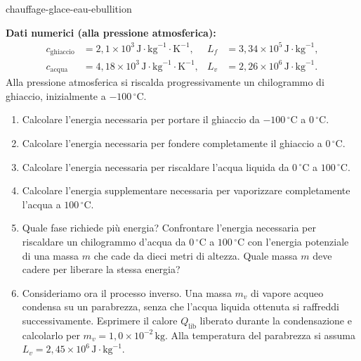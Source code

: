 
\begin{exo}{chauffage-glace-eau-ebullition}

\textbf{Dati numerici (alla pressione atmosferica):}
\[
\begin{aligned}
c_{\text{ghiaccio}} &= 2{,}1\times10^3\,\text{J}\!\cdot\!\text{kg}^{-1}\!\cdot\!\text{K}^{-1},
& L_f &= 3{,}34\times10^5\,\text{J}\!\cdot\!\text{kg}^{-1},\\
c_{\text{acqua}} &= 4{,}18\times10^3\,\text{J}\!\cdot\!\text{kg}^{-1}\!\cdot\!\text{K}^{-1},
& L_v &= 2{,}26\times10^6\,\text{J}\!\cdot\!\text{kg}^{-1}.
\end{aligned}
\]
Alla pressione atmosferica si riscalda progressivamente un chilogrammo di ghiaccio, inizialmente a $-100\,{}^\circ\text{C}$.

\begin{enumerate}
  \item Calcolare l'energia necessaria per portare il ghiaccio da $-100\,{}^\circ\text{C}$ a $0\,{}^\circ\text{C}$.
  \item Calcolare l'energia necessaria per fondere completamente il ghiaccio a $0\,{}^\circ\text{C}$.
  \item Calcolare l'energia necessaria per riscaldare l'acqua liquida da $0\,{}^\circ\text{C}$ a $100\,{}^\circ\text{C}$.
  \item Calcolare l'energia supplementare necessaria per vaporizzare completamente l'acqua a $100\,{}^\circ\text{C}$.
  \item Quale fase richiede più energia? Confrontare l'energia necessaria per riscaldare un chilogrammo d'acqua da $0\,{}^\circ\text{C}$ a $100\,{}^\circ\text{C}$ con l'energia potenziale di una massa $m$ che cade da dieci metri di altezza. Quale massa $m$ deve cadere per liberare la stessa energia?
  \item Consideriamo ora il processo inverso. Una massa $m_v$ di vapore acqueo condensa su un parabrezza, senza che l'acqua liquida ottenuta si raffreddi successivamente. Esprimere il calore $Q_{\text{lib}}$ liberato durante la condensazione e calcolarlo per $m_v=1{,}0\times10^{-2}\,\text{kg}$. Alla temperatura del parabrezza si assuma $L_v=2{,}45\times10^6\,\text{J}\!\cdot\!\text{kg}^{-1}$.
\end{enumerate}


\end{exo}
